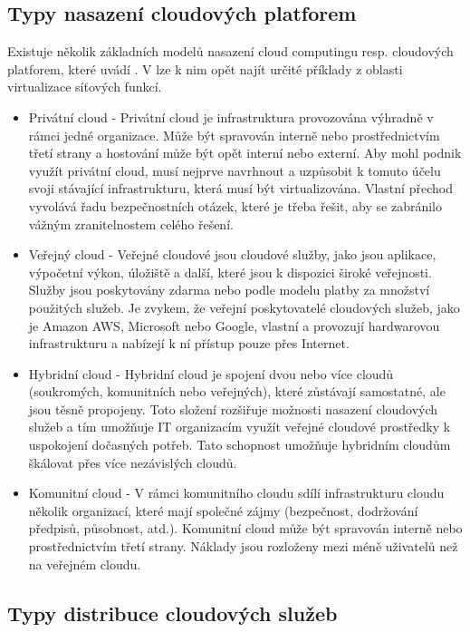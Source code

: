 \subsection{Typy nasazení cloudových platforem}

Existuje několik základních modelů nasazení cloud computingu resp. cloudových platforem, které uvádí \cite{CloudSurvey}. V \cite{NFV_use_cases} lze k nim opět najít určité příklady z oblasti virtualizace síťových funkcí.

\begin{itemize}
\item Privátní cloud - Privátní cloud je  infrastruktura  provozována  výhradně  v  rámci  jedné  organizace. Může být spravován interně nebo prostřednictvím třetí strany a hostování může být opět interní nebo externí.  Aby  mohl  podnik  využít  privátní  cloud,  musí  nejprve  navrhnout a uzpůsobit k tomuto účelu svoji stávající infrastrukturu, která musí být virtualizována.  Vlastní  přechod  vyvolává  řadu  bezpečnostních  otázek,  které  je třeba řešit, aby se zabránilo vážným zranitelnostem celého řešení. 
\item Veřejný cloud - Veřejné cloudové jsou cloudové služby, jako jsou aplikace, výpočetní výkon, úložiště a další, které jsou k dispozici široké  veřejnosti.  Služby  jsou  poskytovány  zdarma  nebo  podle modelu  platby  za  množství  použitých  služeb.  Je  zvykem,  že  veřejní  poskytovatelé cloudových  služeb,  jako  je  Amazon  AWS,  Microsoft  nebo  Google,  vlastní  a  provozují hardwarovou infrastrukturu a nabízejí k ní přístup pouze přes Internet. 
\item Hybridní cloud - Hybridní  cloud je  spojení  dvou  nebo  více  cloudů  (soukromých,  komunitních  nebo veřejných),  které  zůstávají  samostatné,  ale  jsou  těsně  propojeny.  Toto  složení  rozšiřuje možnosti  nasazení  cloudových  služeb  a  tím  umožňuje  IT  organizacím  využít  veřejné cloudové prostředky k uspokojení dočasných potřeb. Tato schopnost umožňuje hybridním cloudům škálovat přes více nezávislých cloudů. 
\item Komunitní cloud - V rámci komunitního cloudu sdílí infrastrukturu cloudu několik organizací, které mají společné zájmy (bezpečnost, dodržování předpisů, působnost, atd.). Komunitní cloud může být spravován interně nebo prostřednictvím třetí strany. Náklady jsou rozloženy mezi méně uživatelů než na veřejném cloudu. 
\end{itemize}

\subsection{Typy distribuce cloudových služeb}

